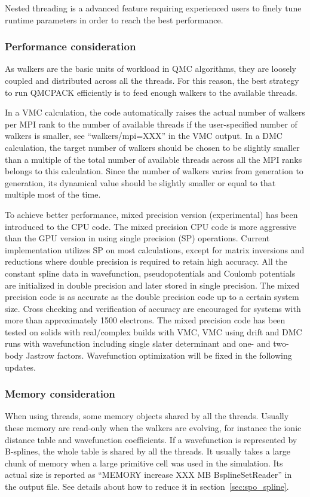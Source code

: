 Nested threading is a advanced feature requiring experienced users to finely tune runtime parameters in order to reach the best performance.

\subsubsection{Performance consideration}
\label{sec:cpu:performance}
As walkers are the basic units of workload in QMC algorithms, they are loosely coupled and distributed across all the threads. For this reason, the best strategy to run QMCPACK efficiently is to feed enough walkers to the available threads.

In a VMC calculation, the code automatically raises the actual number of walkers per MPI rank to the number of available threads if the user-specified number of walkers is smaller, see ``walkers/mpi=XXX'' in the VMC output.
In a DMC calculation, the target number of walkers should be chosen to be slightly smaller than a multiple of the total number of available threads across all the MPI ranks belongs to this calculation. Since the number of walkers varies from generation to generation, its dynamical value should be slightly smaller or equal to that multiple most of the time.

To achieve better performance, mixed precision version (experimental) has been introduced to the CPU code. The mixed precision CPU code is more aggressive than the GPU version in using single precision (SP) operations. Current implementation utilizes SP on most calculations, except for matrix inversions and reductions where double precision is required to retain high accuracy. All the constant spline data in wavefunction, pseudopotentials and Coulomb potentials are initialized in double precision and later stored in single precision. The mixed precision code is as accurate as the double precision code up to a certain system size. Cross checking and verification of accuracy are encouraged for systems with more than approximately 1500 electrons. The mixed precision code has been tested on solids with real/complex builds with VMC, VMC using drift and DMC runs with wavefunction including single slater determinant and one- and two-body Jastrow factors. Wavefunction optimization will be fixed in the following updates.

\subsubsection{Memory consideration}
When using threads, some memory objects shared by all the threads. Usually these memory are read-only when the walkers are evolving, for instance the ionic distance table and wavefunction coefficients.
If a wavefunction is represented by B-splines, the whole table is shared by all the threads. It usually takes a large chunk of memory when a large primitive cell was used in the simulation. Its actual size is reported as ``MEMORY increase XXX MB BsplineSetReader'' in the output file.
See details about how to reduce it in section~\ref{sec:spo_spline}.

